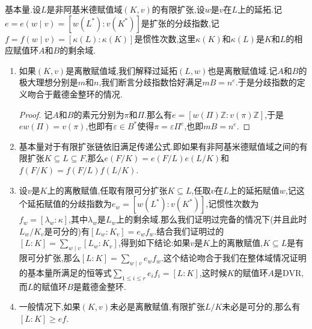 基本量.设$L$是非阿基米德赋值域$(K,v)$的有限扩张,设$w$是$v$在$L$上的延拓.记$e=e(w\mid v)=[w(L^*):v(K^*)]$是扩张的分歧指数,记$f=f(w\mid v)=[\kappa(L):\kappa(K)]$是惯性次数,这里$\kappa(K)$和$\kappa(L)$是$K$和$L$的相应赋值环$A$和$B$的剩余域.
\begin{enumerate}
	\item 如果$(K,v)$是离散赋值域,我们解释过延拓$(L,w)$也是离散赋值域.记$A$和$B$的极大理想分别是$m$和$n$,我们断言分歧指数恰好满足$mB=n^e$.于是分歧指数的定义吻合于戴德金整环的情况.
	\begin{proof}
		
		记$A$和$B$的素元分别为$\pi$和$\Pi$.那么有$e=[w(\Pi)\mathbb{Z}:v(\pi)\mathbb{Z}]$,于是$ew(\Pi)=v(\pi)$,也即有$\varepsilon\in B^*$使得$\pi=\varepsilon\Pi^e$,也即$mB=n^e$.
	\end{proof}
    \item 基本量对于有限扩张链依旧满足传递公式.即如果有非阿基米德赋值域之间的有限扩张$K\subseteq L\subseteq F$,那么$e(F/K)=e(F/L)e(L/K)$和$f(F/K)=f(F/L)f(L/K)$.
    \item 设$v$是$K$上的离散赋值,任取有限可分扩张$K\subseteq L$,任取$v$在$L$上的延拓赋值$w$,记这个延拓赋值的分歧指数为$e_w=[w(L^*):v(K^*)]$,记惯性次数为$f_w=[\lambda_w:\kappa]$,其中$\lambda_w$是$L_w$上的剩余域.那么我们证明过完备的情况下(并且此时$L_w/K_v$是可分的)有$[L_w:K_v]=e_wf_w$.结合我们证明过的$[L:K]=\sum_{w\mid v}[L_w:K_v]$,得到如下结论:如果$v$是$K$上的离散赋值,$K\subseteq L$是有限可分扩张,那么$[L:K]=\sum_{w\mid v}e_wf_w$.这个结论吻合于我们在整体域情况证明的基本量所满足的恒等式$\sum_{1\le i\le r}e_if_i=[L:K]$,这时候$K$的赋值环$A$是DVR,而$L$的赋值环$B$是戴德金整环.
    \item 一般情况下,如果$(K,v)$未必是离散赋值,有限扩张$L/K$未必是可分的,那么有$[L:K]\ge ef$.
\end{enumerate}

